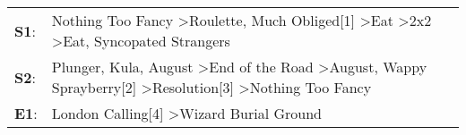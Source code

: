 \begin{supertabular}{p{0.03\textwidth}p{0.92\textwidth}}
 \textbf{S1}:  &                                                 Nothing Too Fancy\textsuperscript{} \textgreater \enspace Roulette\textsuperscript{}, \enspace Much Obliged[1]\textsuperscript{} \textgreater \enspace Eat\textsuperscript{} \textgreater \enspace 2x2\textsuperscript{} \textgreater \enspace Eat\textsuperscript{}, \enspace Syncopated Strangers\textsuperscript{}  \enspace  \\
 \textbf{S2}:  &  Plunger\textsuperscript{}, \enspace Kula\textsuperscript{}, \enspace August\textsuperscript{} \textgreater \enspace End of the Road\textsuperscript{} \textgreater \enspace August\textsuperscript{}, \enspace Wappy Sprayberry[2]\textsuperscript{} \textgreater \enspace Resolution[3]\textsuperscript{} \textgreater \enspace Nothing Too Fancy\textsuperscript{}  \enspace  \\
 \textbf{E1}:  &                                                                                                                                                                                                                                                                      London Calling[4]\textsuperscript{} \textgreater \enspace Wizard Burial Ground\textsuperscript{}  \enspace  \\
\end{supertabular}
